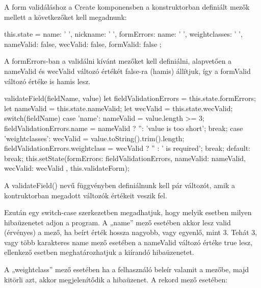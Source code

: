
A form validáláshoz a Create komponensben a konstruktorban definiált mezők mellett a következőket kell megadnunk:

\begin{cpp}
this.state = {
      name: ' ',
      nickname: ' ',
      formErrors: {name: ' ', weightclasses: ' '},
      nameValid: false,
      wecValid: false,
      formValid: false
};
\end{cpp}

A formErrors-ban a validálni kívánt mezőket kell definiálni, alapvetően a nameValid és wecValid változó értékét false-ra (hamis) állítjuk, így a formValid változó értéke is hamis lesz.

\begin{cpp}
validateField(fieldName, value) {
	let fieldValidationErrors = this.state.formErrors;
    let nameValid = this.state.nameValid;
    let wecValid = this.state.wecValid;
    switch(fieldName) {
    case 'name':
   	  nameValid = value.length >= 3;
      fieldValidationErrors.name = nameValid ? '': 'value is too short';
      break;
    case 'weightclasses':
      wecValid = value.toString().trim().length;
      fieldValidationErrors.weightclass = wecValid ? '' : ' is required';
      break;
      default:
      break; }
    this.setState({formErrors: fieldValidationErrors,
                    nameValid: nameValid,
                    wecValid: wecValid
                  }, this.validateForm);
}
\end{cpp}

A validateField() nevű függvényben definiálnunk kell pár változót, amik a kontruktorban megadott változók értékeit veszik fel.

Ezután egy switch-case szerkezetben megadhatjuk, hogy melyik esetben milyen hibaüzenetet adjon a program. 
A „name” mező esetében akkor lesz valid (érvényes) a mező, ha beírt érték hossza nagyobb, vagy egyenlő, mint 3. Tehát 3, vagy több karakteres name mező esetében a nameValid változó értéke true lesz, ellenkező esetben meghatározhatjuk a kiírandó hibaüzenetet.

A „weightclass” mező esetében ha a felhasználó beleír valamit a mezőbe, majd kitörli azt, akkor megjelenítődik a hibaüzenet.
A rekord mező esetében:


